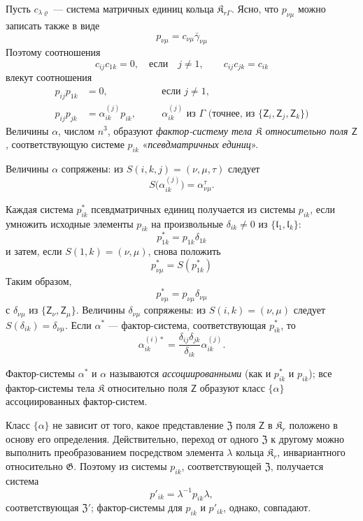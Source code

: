 \documentclass[11pt]{article}
\begin{document}
Пусть \(c_{\lambda\varrho}\) --- система матричных единиц кольца \(\mathfrak K_{r\Gamma}\). Ясно, что \(p_{\nu\mu}\) можно записать также в виде
\[
p_{\nu\mu}=c_{\nu\mu}\bar\gamma_{\nu\mu}
\]
Поэтому соотношения
\[
c_{ij}c_{1k}=0,\quad\text{если}\quad j\ne1,
\qquad
c_{ij}c_{jk}=c_{ik}
\]
влекут соотношения
\[
\begin{aligned}
p_{ij}p_{1k}&=0,\quad &&\text{если }j\ne1,\\
p_{ij}p_{jk}&=\alpha_{ik}^{(j)}p_{ik},\quad
&&\alpha_{ik}^{(j)}\text{ из }\Gamma\text{ (точнее, из }\{\mathsf{Z}_i,\mathsf{Z}_j,\mathsf{Z}_k\}\text{)}
\end{aligned}
\]
Величины \(\alpha\), числом \(n^3\), образуют \emph{фактор-систему тела \(\mathfrak K\) относительно поля \(\mathsf{Z}\)}, соответствующую системе \(p_{ik}\) «\emph{псевдматричных единиц}».

Величины \(\alpha\) сопряжены: из \(S(i,k,j)=(\nu,\mu,\tau)\) следует
\[
S\bigl(\alpha_{ik}^{(j)}\bigr)=\alpha_{\nu\mu}^{\tau}.
\]

Каждая система \(p_{ik}^*\) псевдматричных единиц получается из системы \(p_{ik}\), если умножить исходные элементы \(p_{ik}\) на произвольные \(\delta_{ik}\ne0\) из \(\{\mathfrak l_1,\mathfrak l_k\}\):
\[
p_{1k}^*=p_{1k}\delta_{1k}
\]
и затем, если \(S(1,k)=(\nu,\mu)\), снова положить
\[
p_{\nu\mu}^*=S(p_{1k}^*)
\]
Таким образом,
\[
p_{\nu\mu}^*=p_{\nu\mu}\delta_{\nu\mu}
\]
с \(\delta_{\nu\mu}\) из \(\{\mathsf{Z}_\nu,\mathsf{Z}_\mu\}\). Величины \(\delta_{\nu\mu}\) сопряжены: из \(S(i,k)=(\nu,\mu)\) следует \(S(\delta_{ik})=\delta_{\nu\mu}\). Если \(\alpha^*\) --- фактор-система, соответствующая \(p_{ik}^*\), то
\[
\alpha_{ik}^{(i)*}=\frac{\delta_{ij}\delta_{jk}}{\delta_{ik}}\alpha_{ik}^{(j)}.
\]

Фактор-системы \(\alpha^*\) и \(\alpha\) называются \emph{ассоциированными} (как и \(p_{ik}^*\) и \(p_{ik}\)); все фактор-системы тела \(\mathfrak K\) относительно поля \(\mathsf{Z}\) образуют класс \(\{\alpha\}\) ассоциированных фактор-систем.

Класс \(\{\alpha\}\) не зависит от того, какое представление \(\mathfrak Z\) поля \(\mathsf{Z}\) в \(\mathfrak K_r\) положено в основу его определения. Действительно, переход от одного \(\mathfrak Z\) к другому можно выполнить преобразованием посредством элемента \(\lambda\) кольца \(\mathfrak K_r\), инвариантного относительно \(\mathfrak G\). Поэтому из системы \(p_{ik}\), соответствующей \(\mathfrak Z\), получается система
\[
p'_{ik}=\lambda^{-1}p_{ik}\lambda,
\]
соответствующая \(\mathfrak Z'\); фактор-системы для \(p_{ik}\) и \(p'_{ik}\), однако, совпадают.
\end{document}

